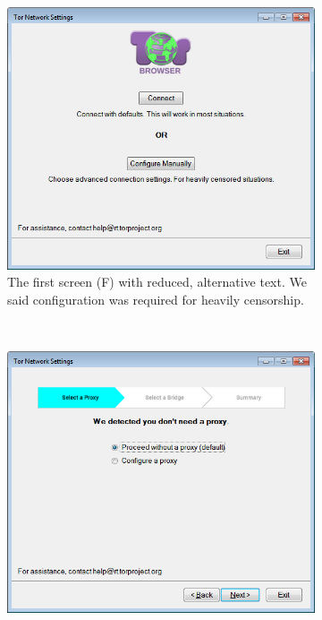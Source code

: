 \documentclass[USenglish,oneside,twocolumn]{article}
\begin{document}
\begin{figure}
\centering
\begin{subfigure}[b]{0.30\textwidth}
	\includegraphics[width=\textwidth]{screenshots/NEW-first.png}
	\centering\captionsetup{width=1.5\linewidth}%
	\caption{The first screen (F) with reduced, alternative text. We said configuration was required for heavily censorship.}
	\label{fig:new-first}
\end{subfigure}
~~~~~~~~~~~~~~~~~~~~~~~~~
\begin{subfigure}[b]{0.30\textwidth}
	\includegraphics[width=\textwidth]{screenshots/NEW-proxyYES.png}

\end{subfigure}
\end{figure}
\end{document}
